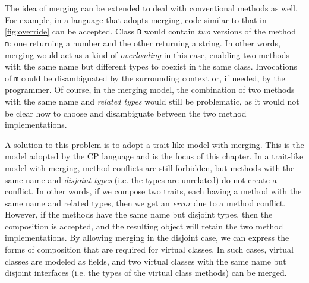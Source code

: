 The idea of merging can be extended to deal with conventional methods as well.
For example, in a language that adopts merging, code similar to that in
\autoref{fig:override} can be accepted. Class \lstinline{B} would contain
\emph{two} versions of the method \lstinline{m}: one returning a number and the
other returning a string. In other words, merging would act as a kind of
\emph{overloading} in this case, enabling two methods with the same name but
different types to coexist in the same class. Invocations of \lstinline{m} could
be disambiguated by the surrounding context or, if needed, by the programmer. Of
course, in the merging model, the combination of two methods with the same name
and \emph{related types} would still be problematic, as it would not be clear
how to choose and disambiguate between the two method implementations.

A solution to this problem is to adopt a trait-like model with merging. This is
the model adopted by the CP language and is the focus of this chapter. In a
trait-like model with merging, method conflicts are still forbidden, but methods
with the same name and \emph{disjoint types} (i.e. the types are unrelated) do
not create a conflict. In other words, if we compose two traits, each having a
method with the same name and related types, then we get an \emph{error} due to
a method conflict. However, if the methods have the same name but disjoint
types, then the composition is accepted, and the resulting object will retain
the two method implementations. By allowing merging in the disjoint case, we can
express the forms of composition that are required for virtual classes. In such
cases, virtual classes are modeled as fields, and two virtual classes with the
same name but disjoint interfaces (i.e. the types of the virtual class methods)
can be merged.

